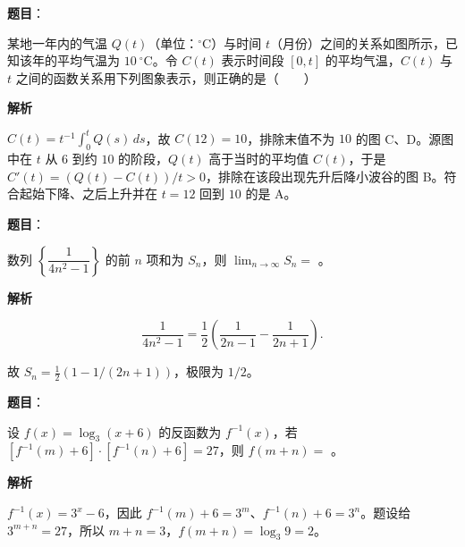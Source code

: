 \begin{answer}

\textbf{题目}：

某地一年内的气温 $Q(t)$（单位：$^\circ\mathrm C$）与时间 $t$（月份）之间的关系如图所示，已知该年的平均气温为 $10\ ^\circ\mathrm C$。令 $C(t)$ 表示时间段 $[0,t]$ 的平均气温，$C(t)$ 与 $t$ 之间的函数关系用下列图象表示，则正确的是\mbox{（　　）}
\nopagebreak[4]
\begin{center}\end{center}
\nopagebreak[4]
\textbf{解析}

$C(t)=t^{-1}\int_0^tQ(s)\,ds$，故 $C(12)=10$，排除末值不为 $10$ 的图 C、D。源图中在 $t$ 从 $6$ 到约 $10$ 的阶段，$Q(t)$ 高于当时的平均值 $C(t)$，于是 $C'(t)=(Q(t)-C(t))/t>0$，排除在该段出现先升后降小波谷的图 B。符合起始下降、之后上升并在 $t=12$ 回到 $10$ 的是 A。


\end{answer}
\begin{answer}

\textbf{题目}：

数列 $\left\{\dfrac1{4n^2-1}\right\}$ 的前 $n$ 项和为 $S_n$，则 $\lim_{n\to\infty}S_n=$ \gkblank{}。

\textbf{解析}

\nopagebreak[4]
\[
\frac1{4n^2-1}=\frac12\left(\frac1{2n-1}-\frac1{2n+1}\right).
\]

故 $S_n=\frac12(1-1/(2n+1))$，极限为 $1/2$。


\end{answer}
\begin{answer}

\textbf{题目}：

设 $f(x)=\log_3(x+6)$ 的反函数为 $f^{-1}(x)$，若 $[f^{-1}(m)+6]\cdot[f^{-1}(n)+6]=27$，则 $f(m+n)=$ \gkblank{}。

\textbf{解析}

$f^{-1}(x)=3^x-6$，因此 $f^{-1}(m)+6=3^m$、$f^{-1}(n)+6=3^n$。题设给 $3^{m+n}=27$，所以 $m+n=3$，$f(m+n)=\log_3 9=2$。


\end{answer}
